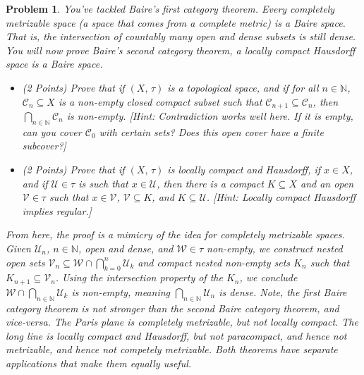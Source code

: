 \documentclass{article}
\theoremstyle{normal}
\newtheorem{problem}{Problem}
\begin{document}
    \begin{problem}
        You've tackled Baire's first category theorem. Every completely
        metrizable space (a space that comes from a complete metric) is a
        Baire space. That is, the intersection of countably
        many open and dense subsets is still dense. You will now prove Baire's
        second category theorem, a locally compact Hausdorff space is a
        Baire space.
        \begin{itemize}
            \item (2 Points)
                Prove that if $(X,\,\tau)$ is a topological space, and if for
                all $n\in\mathbb{N}$, $\mathcal{C}_{n}\subseteq{X}$ is a
                non-empty closed compact subset such that
                $\mathcal{C}_{n+1}\subseteq\mathcal{C}_{n}$, then
                $\bigcap_{n\in\mathbb{N}}\mathcal{C}_{n}$ is non-empty.
                [Hint: Contradiction works well here. If it is empty, can you
                cover $\mathcal{C}_{0}$ with certain sets? Does this open cover
                have a finite subcover?]
            \item (2 Points)
                Prove that if $(X,\,\tau)$ is locally compact and Hausdorff, if
                $x\in{X}$, and if $\mathcal{U}\in\tau$ is such that
                $x\in\mathcal{U}$, then there is a compact $K\subseteq{X}$ and
                an open $\mathcal{V}\in\tau$ such that
                $x\in\mathcal{V}$, $\mathcal{V}\subseteq{K}$, and
                $K\subseteq\mathcal{U}$. [Hint: Locally compact Hausdorff
                implies regular.]
        \end{itemize}
        From here, the proof is a mimicry of the idea for completely metrizable
        spaces. Given $\mathcal{U}_{n}$, $n\in\mathbb{N}$, open and dense,
        and $\mathcal{W}\in\tau$ non-empty, we construct nested open sets
        $\mathcal{V}_{n}\subseteq\mathcal{W}\cap\bigcap_{k=0}^{n}\mathcal{U}_{k}$
        and compact nested non-empty sets $K_{n}$ such that
        $K_{n+1}\subseteq\mathcal{V}_{n}$. Using the intersection property of
        the $K_{n}$, we conclude $\mathcal{W}\cap\bigcap_{n\in\mathbb{N}}\mathcal{U}_{k}$
        is non-empty, meaning $\bigcap_{n\in\mathbb{N}}\mathcal{U}_{n}$ is
        dense. Note, the first Baire category theorem is not stronger than the
        second Baire category theorem, and vice-versa. The Paris plane is
        completely metrizable, but not locally compact. The long line is locally
        compact and Hausdorff, but not paracompact, and hence not metrizable,
        and hence not competely metrizable. Both theorems have separate
        applications that make them equally useful.
    \end{problem}
\end{document}
